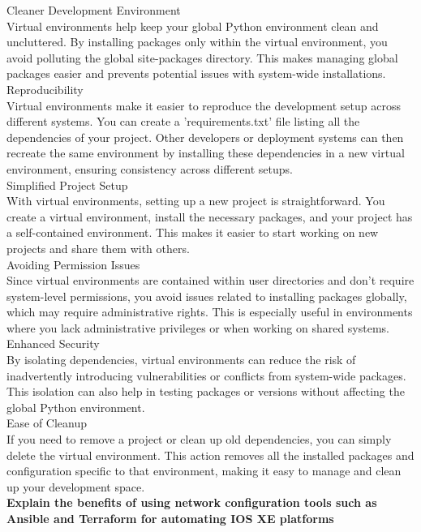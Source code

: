 \documentclass{article}
\begin{document}
\noindent Cleaner Development Environment\\

	Virtual environments help keep your global Python environment clean and uncluttered. By installing packages only within the virtual environment, you avoid polluting the global site-packages directory. This makes managing global packages easier and prevents potential issues with system-wide installations.\\

\noindent Reproducibility\\
	
	Virtual environments make it easier to reproduce the development setup across different systems. You can create a 'requirements.txt' file listing all the dependencies of your project. Other developers or deployment systems can then recreate the same environment by installing these dependencies in a new virtual environment, ensuring consistency across different setups.\\

\noindent Simplified Project Setup\\

	With virtual environments, setting up a new project is straightforward. You create a virtual environment, install the necessary packages, and your project has a self-contained environment. This makes it easier to start working on new projects and share them with others.\\

\noindent Avoiding Permission Issues\\

	Since virtual environments are contained within user directories and don’t require system-level permissions, you avoid issues related to installing packages globally, which may require administrative rights. This is especially useful in environments where you lack administrative privileges or when working on shared systems.\\

\noindent Enhanced Security\\

	By isolating dependencies, virtual environments can reduce the risk of inadvertently introducing vulnerabilities or conflicts from system-wide packages. This isolation can also help in testing packages or versions without affecting the global Python environment.\\

\noindent Ease of Cleanup\\

	If you need to remove a project or clean up old dependencies, you can simply delete the virtual environment. This action removes all the installed packages and configuration specific to that environment, making it easy to manage and clean up your development space.\\

\textbf{Explain the benefits of using network configuration tools such as Ansible and Terraform for automating IOS XE platforms}\\
\end{document}
